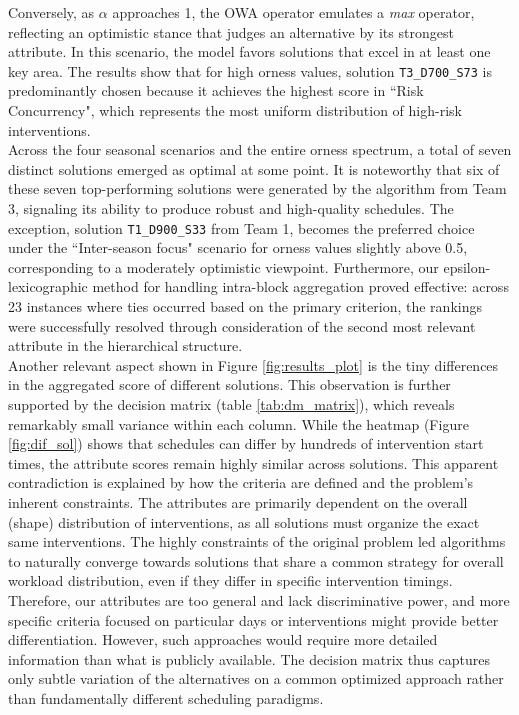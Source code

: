 Conversely, as $\alpha$ approaches 1, the OWA operator emulates a \textit{max} operator, reflecting an optimistic stance that judges an alternative by its strongest attribute. In this scenario, the model favors solutions that excel in at least one key area. The results show that for high orness values, solution \texttt{T3\_D700\_S73} is predominantly chosen because it achieves the highest score in ``Risk Concurrency", which represents the most uniform distribution of high-risk interventions.\\

Across the four seasonal scenarios and the entire orness spectrum, a total of seven distinct solutions emerged as optimal at some point. It is noteworthy that six of these seven top-performing solutions were generated by the algorithm from Team 3, signaling its ability to produce robust and high-quality schedules. The exception, solution \texttt{T1\_D900\_S33} from Team 1, becomes the preferred choice under the ``Inter-season focus" scenario for orness values slightly above 0.5, corresponding to a moderately optimistic viewpoint. Furthermore, our epsilon-lexicographic method for handling intra-block aggregation proved effective: across 23 instances where ties occurred based on the primary criterion, the rankings were successfully resolved through consideration of the second most relevant attribute in the hierarchical structure.\\

Another relevant aspect shown in Figure \ref{fig:results_plot} is the tiny differences in the aggregated score of different solutions. This observation is further supported by the decision matrix (table \ref{tab:dm_matrix}), which reveals remarkably small variance within each column. While the heatmap (Figure \ref{fig:dif_sol}) shows that schedules can differ by hundreds of intervention start times, the attribute scores remain highly similar across solutions. This apparent contradiction is explained by how the criteria are defined and the problem's inherent constraints. The attributes are primarily dependent on the overall (shape) distribution of interventions, as all solutions must organize the exact same interventions. The highly constraints of the original problem led algorithms to naturally converge towards solutions that share a common strategy for overall workload distribution, even if they differ in specific intervention timings. Therefore, our attributes are too general and lack discriminative power, and more specific criteria focused on particular days or interventions might provide better differentiation. However, such approaches would require more detailed information than what is publicly available. The decision matrix thus captures only subtle variation of the alternatives on a common optimized approach rather than fundamentally different scheduling paradigms. \\

